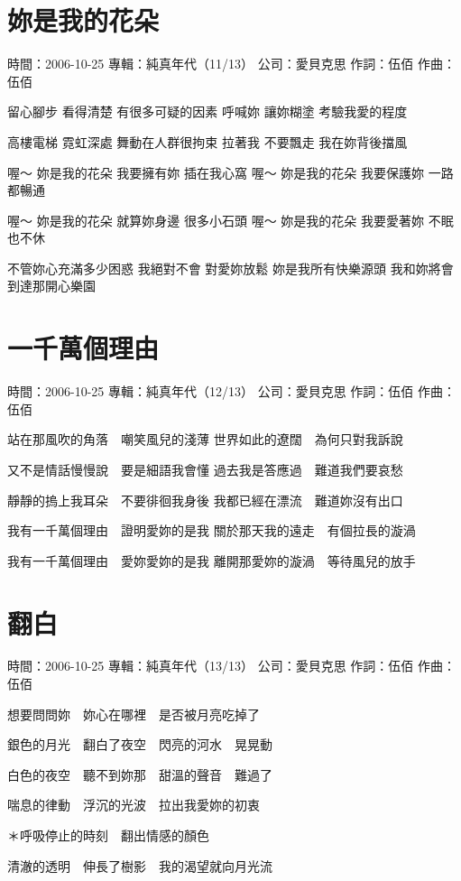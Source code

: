 \documentclass[UTF8,a4paper,oneside,twocolumn,12pt]{ctexbook}
\newcommand{\infopair}[2]{\textbullet #1：#2}
\newcommand{\zc}[1][伍佰]{\infopair{作詞}{#1}}
\newcommand{\zq}[1][伍佰]{\infopair{作曲}{#1}}
\newcommand{\zj}[1]{\infopair{專輯}{#1}}
\newcommand{\sj}[1]{\infopair{時間}{#1}}
\newcommand{\gs}[1]{\infopair{公司}{#1}}
\newenvironment{info}{\begin{flushleft}\kaishu
	}
	{\end{flushleft}\normalsize\yahei\par}
\newenvironment{lyric}{
	}
{}
\begin{document}
\section{妳是我的花朵}
\begin{info}
	\sj{2006-10-25}
	\zj{純真年代（11/13）}
	\gs{愛貝克思}
	\zc
	\zq
\end{info}
\begin{lyric}
	留心腳步 看得清楚 有很多可疑的因素
	呼喊妳 讓妳糊塗 考驗我愛的程度

	高樓電梯 霓虹深處 舞動在人群很拘束
	拉著我 不要飄走 我在妳背後擋風

	喔～ 妳是我的花朵 我要擁有妳 插在我心窩
	喔～ 妳是我的花朵 我要保護妳 一路都暢通

	喔～ 妳是我的花朵 就算妳身邊 很多小石頭
	喔～ 妳是我的花朵 我要愛著妳 不眠也不休

	不管妳心充滿多少困惑 我絕對不會 對愛妳放鬆
	妳是我所有快樂源頭 我和妳將會 到達那開心樂園
\end{lyric}

\section{一千萬個理由}
\begin{info}
	\sj{2006-10-25}
	\zj{純真年代（12/13）}
	\gs{愛貝克思}
	\zc
	\zq
\end{info}
\begin{lyric}
	站在那風吹的角落　嘲笑風兒的淺薄
	世界如此的遼闊　為何只對我訴說

	又不是情話慢慢說　要是細語我會懂
	過去我是答應過　難道我們要哀愁

	靜靜的摀上我耳朵　不要徘徊我身後
	我都已經在漂流　難道妳沒有出口

	我有一千萬個理由　證明愛妳的是我
	關於那天我的遠走　有個拉長的漩渦

	我有一千萬個理由　愛妳愛妳的是我
	離開那愛妳的漩渦　等待風兒的放手
\end{lyric}

\section{翻白}
\begin{info}
	\sj{2006-10-25}
	\zj{純真年代（13/13）}
	\gs{愛貝克思}
	\zc
	\zq
\end{info}
\begin{lyric}
	想要問問妳　妳心在哪裡　是否被月亮吃掉了

	銀色的月光　翻白了夜空　閃亮的河水　晃晃動

	白色的夜空　聽不到妳那　甜溫的聲音　難過了

	喘息的律動　浮沉的光波　拉出我愛妳的初衷

	＊呼吸停止的時刻　翻出情感的顏色

	清澈的透明　伸長了樹影　我的渴望就向月光流
\end{lyric}
\end{document}
